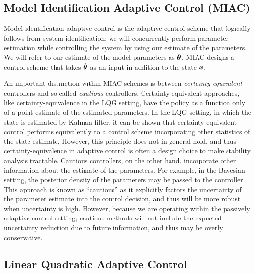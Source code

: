 \subsection{Model Identification Adaptive Control (MIAC)}

Model identification adaptive control is the adaptive control scheme that logically follows from system identification: we will concurrently perform parameter estimation while controlling the system by using our estimate of the parameters. We will refer to our estimate of the model parameters as $\hat{\bm{\theta}}$. MIAC designs a control scheme that takes $\hat{\bm{\theta}}$ as an input in addition to the state $\bm{x}$. 



An important distinction within MIAC schemes is between \textit{certainty-equivalent} controllers and so-called \textit{cautious} controllers. Certainty-equivalent approaches, like certainty-equivalence in the LQG setting, have the policy as a function only of a point estimate of the estimated parameters. In the LQG setting, in which the state is estimated by Kalman filter, it can be shown that certainty-equivalent control performs equivalently to a control scheme incorporating other statistics of the state estimate. However, this principle does not in general hold, and thus certainty-equivalence in adaptive control is often a design choice to make stability analysis tractable. Cautious controllers, on the other hand, incorporate other information about the estimate of the parameters. For example, in the Bayesian setting, the posterior density of the parameters may be passed to the controller. This approach is known as ``cautious'' as it explicitly factors the uncertainty of the parameter estimate into the control decision, and thus will be more robust when uncertainty is high. However, because we are operating within the passively adaptive control setting, cautious methods will not include the expected uncertainty reduction due to future information, and thus may be overly conservative. 


\subsection{Linear Quadratic Adaptive Control}

